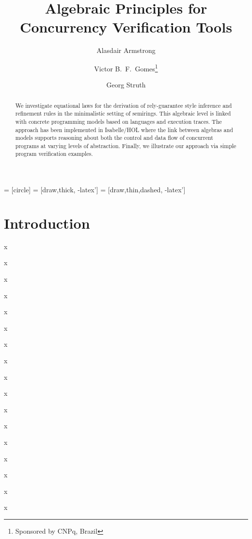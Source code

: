 \documentclass{llncs}
\begin{document}
 = [circle]
 = [draw,thick, -latex']
 = [draw,thin,dashed, -latex']

\title{Algebraic Principles for Concurrency Verification Tools}

\author{Alasdair Armstrong \and Victor B.~F.~Gomes\thanks{Sponsored by CNPq, Brazil}  \and Georg Struth}


\maketitle

\begin{abstract}
  We investigate equational laws for the derivation of rely-guarantee
  style inference and refinement rules in the minimalistic setting of
  semirings. This algebraic level is linked with concrete programming
  models based on languages and execution traces. The approach has
  been implemented in Isabelle/HOL where the link between algebras and
  models supports reasoning about both the control and data flow of
  concurrent programs at varying levels of abstraction. Finally, we
  illustrate our approach via simple program verification examples.
\end{abstract}

\pagestyle{plain}

\section{Introduction}

x

x

x

x

x

x

x

x

x

x

x

x

x

x

x

x

x
\end{document}
